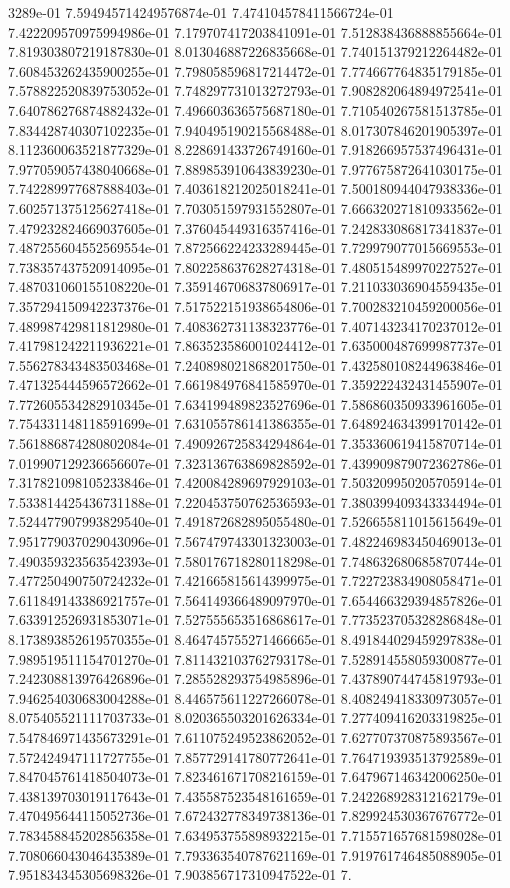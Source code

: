 3289e-01	7.594945714249576874e-01	7.474104578411566724e-01	7.422209570975994986e-01	7.179707417203841091e-01	7.512838436888855664e-01	7.819303807219187830e-01	8.013046887226835668e-01	7.740151379212264482e-01	7.608453262435900255e-01	7.798058596817214472e-01	7.774667764835179185e-01	7.578822520839753052e-01	7.748297731013272793e-01	7.908282064894972541e-01	7.640786276874882432e-01	7.496603636575687180e-01	7.710540267581513785e-01	7.834428740307102235e-01	7.940495190215568488e-01	8.017307846201905397e-01	8.112360063521877329e-01	8.228691433726749160e-01	7.918266957537496431e-01	7.977059057438040668e-01	7.889853910643839230e-01	7.977675872641030175e-01	7.742289977687888403e-01	7.403618212025018241e-01	7.500180944047938336e-01	7.602571375125627418e-01	7.703051597931552807e-01	7.666320271810933562e-01	7.479232824669037605e-01	7.376045449316357416e-01	7.242833086817341837e-01	7.487255604552569554e-01	7.872566224233289445e-01	7.729979077015669553e-01	7.738357437520914095e-01	7.802258637628274318e-01	7.480515489970227527e-01	7.487031060155108220e-01	7.359146706837806917e-01	7.211033036904559435e-01	7.357294150942237376e-01	7.517522151938654806e-01	7.700283210459200056e-01	7.489987429811812980e-01	7.408362731138323776e-01	7.407143234170237012e-01	7.417981242211936221e-01	7.863523586001024412e-01	7.635000487699987737e-01	7.556278343483503468e-01	7.240898021868201750e-01	7.432580108244963846e-01	7.471325444596572662e-01	7.661984976841585970e-01	7.359222432431455907e-01	7.772605534282910345e-01	7.634199489823527696e-01	7.586860350933961605e-01	7.754331148118591699e-01	7.631055786141386355e-01	7.648924634399170142e-01	7.561886874280802084e-01	7.490926725834294864e-01	7.353360619415870714e-01	7.019907129236656607e-01	7.323136763869828592e-01	7.439909879072362786e-01	7.317821098105233846e-01	7.420084289697929103e-01	7.503209950205705914e-01	7.533814425436731188e-01	7.220453750762536593e-01	7.380399409343334494e-01	7.524477907993829540e-01	7.491872682895055480e-01	7.526655811015615649e-01	7.951779037029043096e-01	7.567479743301323003e-01	7.482246983450469013e-01	7.490359323563542393e-01	7.580176718280118298e-01	7.748632680685870744e-01	7.477250490750724232e-01	7.421665815614399975e-01	7.722723834908058471e-01	7.611849143386921757e-01	7.564149366489097970e-01	7.654466329394857826e-01	7.633912526931853071e-01	7.527555653516868617e-01	7.773523705328286848e-01	8.173893852619570355e-01	8.464745755271466665e-01	8.491844029459297838e-01	7.989519511154701270e-01	7.811432103762793178e-01	7.528914558059300877e-01	7.242308813976426896e-01	7.285528293754985896e-01	7.437890744745819793e-01	7.946254030683004288e-01	8.446575611227266078e-01	8.408249418330973057e-01	8.075405521111703733e-01	8.020365503201626334e-01	7.277409416203319825e-01	7.547846971435673291e-01	7.611075249523862052e-01	7.627707370875893567e-01	7.572424947111727755e-01	7.857729141780772641e-01	7.764719393513792589e-01	7.847045761418504073e-01	7.823461671708216159e-01	7.647967146342006250e-01	7.438139703019117643e-01	7.435587523548161659e-01	7.242268928312162179e-01	7.470495644115052736e-01	7.672432778349738136e-01	7.829924530367676772e-01	7.783458845202856358e-01	7.634953755898932215e-01	7.715571657681598028e-01	7.708066043046435389e-01	7.793363540787621169e-01	7.919761746485088905e-01	7.951834345305698326e-01	7.903856717310947522e-01	7.
